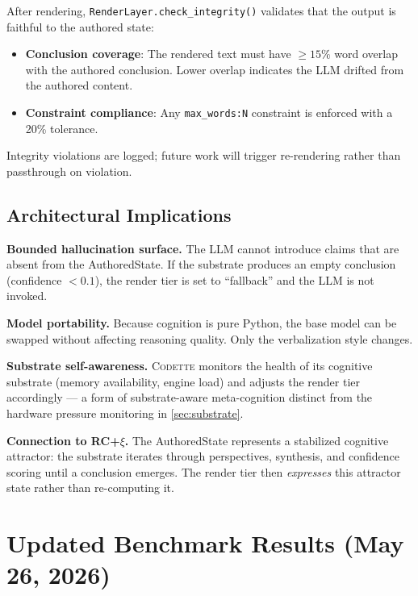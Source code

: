 \documentclass[11pt,a4paper]{article}
\newcommand{\codette}{\textsc{Codette}}
\begin{document}
After rendering, \texttt{RenderLayer.check\_integrity()} validates that the
output is faithful to the authored state:

\begin{itemize}[nosep]
  \item \textbf{Conclusion coverage}: The rendered text must have $\geq 15\%$
    word overlap with the authored conclusion. Lower overlap indicates the LLM
    drifted from the authored content.
  \item \textbf{Constraint compliance}: Any \texttt{max\_words:N} constraint
    is enforced with a 20\% tolerance.
\end{itemize}

Integrity violations are logged; future work will trigger re-rendering rather
than passthrough on violation.

\subsection{Architectural Implications}

\textbf{Bounded hallucination surface.} The LLM cannot introduce claims that
are absent from the AuthoredState. If the substrate produces an empty
conclusion (confidence $< 0.1$), the render tier is set to ``fallback'' and
the LLM is not invoked.

\textbf{Model portability.} Because cognition is pure Python, the base model
can be swapped without affecting reasoning quality. Only the verbalization
style changes.

\textbf{Substrate self-awareness.} \codette{} monitors the health of its
cognitive substrate (memory availability, engine load) and adjusts the
render tier accordingly --- a form of substrate-aware meta-cognition distinct
from the hardware pressure monitoring in \cref{sec:substrate}.

\textbf{Connection to RC+$\xi$.} The AuthoredState represents a stabilized
cognitive attractor: the substrate iterates through perspectives, synthesis,
and confidence scoring until a conclusion emerges. The render tier then
\emph{expresses} this attractor state rather than re-computing it.

\section{Updated Benchmark Results (May 26, 2026)}
\label{sec:results-v8}
\end{document}
